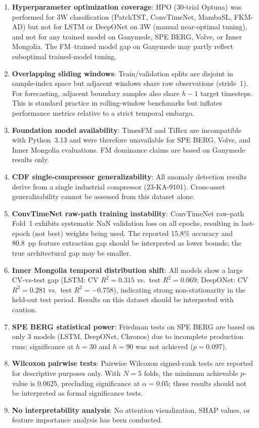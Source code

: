 \documentclass[conference]{IEEEtran}
\begin{document}
\begin{enumerate}
    \item \textbf{Hyperparameter optimization coverage}: HPO (30-trial Optuna) was performed for 3W classification (PatchTST, ConvTimeNet, MambaSL, FKM-AD) but not for LSTM or DeepONet on 3W (manual near-optimal tuning), and not for any trained model on Ganymede, SPE BERG, Volve, or Inner Mongolia. The FM--trained model gap on Ganymede may partly reflect suboptimal trained-model tuning.
    \item \textbf{Overlapping sliding windows}: Train/validation splits are disjoint in sample-index space but adjacent windows share raw observations (stride~1). For forecasting, adjacent boundary samples also share $h{-}1$ target timesteps. This is standard practice in rolling-window benchmarks but inflates performance metrics relative to a strict temporal embargo.
    \item \textbf{Foundation model availability}: TimesFM and TiRex are incompatible with Python~3.13 and were therefore unavailable for SPE BERG, Volve, and Inner Mongolia evaluations. FM dominance claims are based on Ganymede results only.
    \item \textbf{CDF single-compressor generalizability}: All anomaly detection results derive from a single industrial compressor (23-KA-9101). Cross-asset generalizability cannot be assessed from this dataset alone.
    \item \textbf{ConvTimeNet raw-path training instability}: ConvTimeNet raw-path Fold~1 exhibits systematic NaN validation loss on all epochs, resulting in last-epoch (not best) weights being used. The reported 15.8\% accuracy and 80.8~pp feature extraction gap should be interpreted as lower bounds; the true architectural gap may be smaller.
    \item \textbf{Inner Mongolia temporal distribution shift}: All models show a large CV-vs-test gap (LSTM: CV $R^2{=}0.315$ vs.\ test $R^2{=}0.069$; DeepONet: CV $R^2{=}0.281$ vs.\ test $R^2{=}{-}0.758$), indicating strong non-stationarity in the held-out test period. Results on this dataset should be interpreted with caution.
    \item \textbf{SPE BERG statistical power}: Friedman tests on SPE BERG are based on only 3 models (LSTM, DeepONet, Chronos) due to incomplete production runs; significance at $h{=}30$ and $h{=}90$ was not achieved ($p{=}0.097$).
    \item \textbf{Wilcoxon pairwise tests}: Pairwise Wilcoxon signed-rank tests are reported for descriptive purposes only. With $N{=}5$ folds, the minimum achievable $p$-value is 0.0625, precluding significance at $\alpha{=}0.05$; these results should not be interpreted as formal significance tests.
    \item \textbf{No interpretability analysis}: No attention visualization, SHAP values, or feature importance analysis has been conducted.
\end{enumerate}
\end{document}
